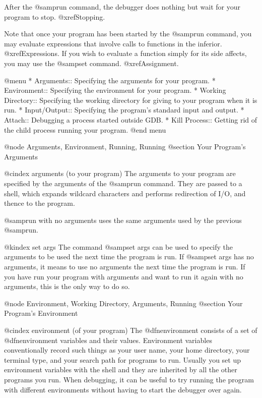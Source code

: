 After the @samp{run} command, the debugger does nothing but wait for your
program to stop.  @xref{Stopping}.

Note that once your program has been started by the @samp{run} command,
you may evaluate expressions that involve calls to functions in the
inferior.  @xref{Expressions}.  If you wish to evaluate a function
simply for its side affects, you may use the @samp{set} command.
@xref{Assignment}.

@menu
* Arguments::          Specifying the arguments for your program.
* Environment::        Specifying the environment for your program.
* Working Directory::  Specifying the working directory for giving
                       to your program when it is run.
* Input/Output::       Specifying the program's standard input and output.
* Attach::             Debugging a process started outside GDB.
* Kill Process::       Getting rid of the child process running your program.
@end menu

@node Arguments, Environment, Running, Running
@section Your Program's Arguments

@cindex arguments (to your program)
The arguments to your program are specified by the arguments of the 
@samp{run} command.  They are passed to a shell, which expands wildcard
characters and performs redirection of I/O, and thence to the program.

@samp{run} with no arguments uses the same arguments used by the previous
@samp{run}.

@kindex set args
The command @samp{set args} can be used to specify the arguments to be used
the next time the program is run.  If @samp{set args} has no arguments, it
means to use no arguments the next time the program is run.  If you have
run your program with arguments and want to run it again with no arguments,
this is the only way to do so.

@node Environment, Working Directory, Arguments, Running
@section Your Program's Environment

@cindex environment (of your program)
The @dfn{environment} consists of a set of @dfn{environment variables} and
their values.  Environment variables conventionally record such things as
your user name, your home directory, your terminal type, and your search
path for programs to run.  Usually you set up environment variables with
the shell and they are inherited by all the other programs you run.  When
debugging, it can be useful to try running the program with different
environments without having to start the debugger over again.

